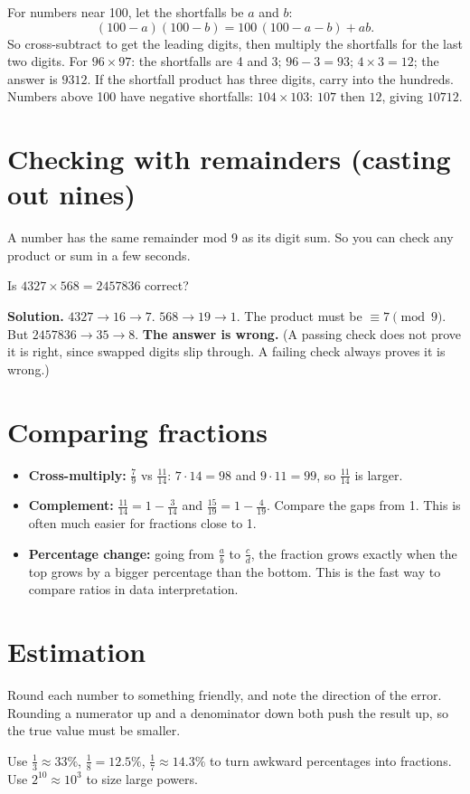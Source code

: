 \documentclass[11pt,a4paper,openany]{report}
\begin{document}
\begin{why}
For numbers near 100, let the shortfalls be $a$ and $b$:
\[(100-a)(100-b)=100\,(100-a-b)+ab.\]
So cross-subtract to get the leading digits, then multiply the shortfalls for the last two digits. For $96\times97$: the shortfalls are 4 and 3; $96-3=93$; $4\times3=12$; the answer is $9312$. If the shortfall product has three digits, carry into the hundreds. Numbers above 100 have negative shortfalls: $104\times103$: $107$ then $12$, giving $10712$.
\end{why}

\section{Checking with remainders (casting out nines)}
A number has the same remainder mod 9 as its digit sum. So you can check any product or sum in a few seconds.
\begin{example}
Is $4327\times568=2457836$ correct?

\textbf{Solution.} $4327\to16\to7$. $568\to19\to1$. The product must be $\equiv7\pmod9$. But $2457836\to35\to8$. \textbf{The answer is wrong.} (A passing check does not prove it is right, since swapped digits slip through. A failing check always proves it is wrong.)
\end{example}

\section{Comparing fractions}
\begin{itemize}
\item \textbf{Cross-multiply:} $\frac{7}{9}$ vs $\frac{11}{14}$: $7\cdot14=98$ and $9\cdot11=99$, so $\frac{11}{14}$ is larger.
\item \textbf{Complement:} $\frac{11}{14}=1-\frac3{14}$ and $\frac{15}{19}=1-\frac4{19}$. Compare the gaps from 1. This is often much easier for fractions close to 1.
\item \textbf{Percentage change:} going from $\frac{a}{b}$ to $\frac{c}{d}$, the fraction grows exactly when the top grows by a bigger percentage than the bottom. This is the fast way to compare ratios in data interpretation.
\end{itemize}

\section{Estimation}
\begin{idea}
Round each number to something friendly, and note the direction of the error. Rounding a numerator up and a denominator down both push the result up, so the true value must be smaller.

Use $\frac13\approx33\%$, $\frac18=12.5\%$, $\frac17\approx14.3\%$ to turn awkward percentages into fractions. Use $2^{10}\approx10^3$ to size large powers.
\end{idea}
\end{document}
